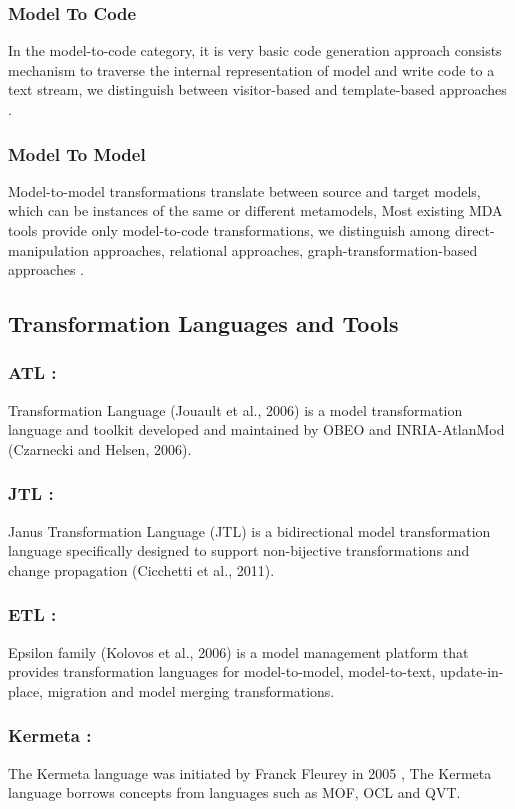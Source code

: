 \subsubsection{Model To Code}
In the model-to-code category, it is very basic code generation approach consists mechanism to traverse the internal representation of model and write code to a text stream, we distinguish between visitor-based and template-based approaches \cite{ch3catego}.
\subsubsection{Model To Model}
Model-to-model transformations translate between source and target models, which can be instances of the same or different metamodels, Most existing MDA tools provide only model-to-code transformations, we distinguish among direct-manipulation approaches, relational approaches, graph-transformation-based approaches \cite{ch3catego}.

\subsection{Transformation Languages and Tools}

\subsubsection{ATL :}
Transformation Language (Jouault et al., 2006) is a model transformation language and
toolkit developed and maintained by OBEO and INRIA-AtlanMod (Czarnecki and Helsen, 2006)\cite{ch3lang}.

\subsubsection{JTL :}
Janus Transformation Language (JTL) is a bidirectional model transformation language specifically designed to support non-bijective transformations and change propagation (Cicchetti et al., 2011)\cite{ch3lang}.

\subsubsection{ETL :}
Epsilon family (Kolovos et al., 2006) is a model management platform that provides transformation languages for model-to-model, model-to-text, update-in-place, migration and model merging transformations\cite{ch3lang}.

\subsubsection{Kermeta :}  
The Kermeta language was initiated by Franck Fleurey in 2005 , The Kermeta language borrows concepts from languages such as MOF, OCL and QVT\cite{ch3lang}.

